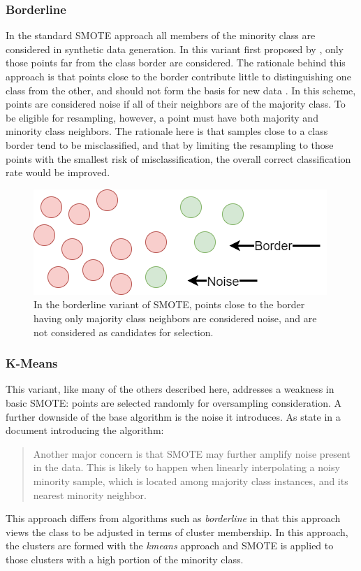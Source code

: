 \documentclass[letterpaper]{report}
\begin{document}
\subsubsection{Borderline}
In the standard SMOTE approach all members of the minority class are considered in synthetic data generation. In this variant first proposed by \citeauthor{Han2005-ui}, only those points far from the class border are considered. The rationale behind this approach is that points close to the border contribute little to distinguishing one class from the other, and should not form the basis for new data \cite{Han2005-ui}. In this scheme, points are considered noise if all of their neighbors are of the majority class. To be eligible for resampling, however, a point must have both majority and minority class neighbors. The rationale here is that samples close to a class border tend to be misclassified, and that by limiting the resampling to those points with the smallest risk of misclassification, the overall correct classification rate would be improved.
\begin{figure}[H]
	\centering
	\includegraphics[scale=0.30]{./figures/borderline.png}
	\caption[Borderline selection of synthetic data points]{In the borderline variant of SMOTE, points close to the border having only majority class neighbors are considered noise, and are not considered as candidates for selection. }
	\label{fig:borderline}
\end{figure}
%
%


\subsubsection{K-Means}
This variant, like many of the others described here, addresses a weakness in basic SMOTE: points are selected randomly for oversampling consideration. A further downside of the base algorithm is the noise it introduces. As \citeauthor{Last2017-rh} state in a document introducing the algorithm:
\begin{quote}
Another major concern is that SMOTE may further amplify noise present in the data. This is likely
to happen when linearly interpolating a noisy minority sample, which is located among majority class
instances, and its nearest minority neighbor. \parencite{Last2017-rh}
\end{quote}
This approach differs from algorithms such as \textit{borderline} in that this approach views the class to be adjusted in terms of cluster membership.  In this approach, the clusters are formed with the \textit{kmeans} approach and SMOTE is applied to those clusters with a high portion of the minority class.
\end{document}
